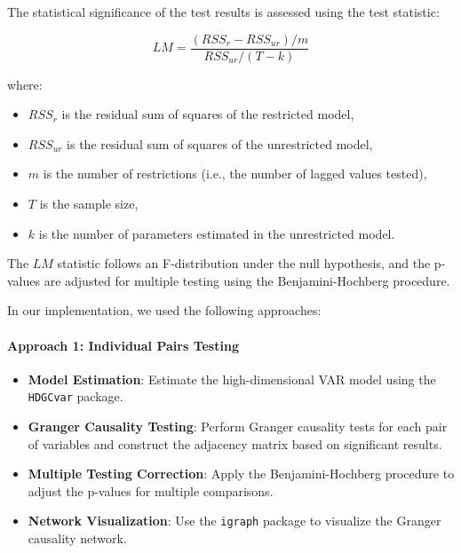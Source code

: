 \documentclass[12pt]{article}
\begin{document}
The statistical significance of the test results is assessed using the test statistic:

\[
LM = \frac{(RSS_r - RSS_{ur}) / m}{RSS_{ur} / (T - k)}
\]

where:
\begin{itemize}
    \item \(RSS_r\) is the residual sum of squares of the restricted model,
    \item \(RSS_{ur}\) is the residual sum of squares of the unrestricted model,
    \item \(m\) is the number of restrictions (i.e., the number of lagged values tested),
    \item \(T\) is the sample size,
    \item \(k\) is the number of parameters estimated in the unrestricted model.
\end{itemize}

The \(LM\) statistic follows an F-distribution under the null hypothesis, and the p-values are adjusted for multiple testing using the Benjamini-Hochberg procedure.

In our implementation, we used the following approaches:

\paragraph{Approach 1: Individual Pairs Testing}
\begin{itemize}

    \item \textbf{Model Estimation}: Estimate the high-dimensional VAR model using the \texttt{HDGCvar} package.
    \item \textbf{Granger Causality Testing}: Perform Granger causality tests for each pair of variables and construct the adjacency matrix based on significant results.
    \item \textbf{Multiple Testing Correction}: Apply the Benjamini-Hochberg procedure to adjust the p-values for multiple comparisons.
    \item \textbf{Network Visualization}: Use the \texttt{igraph} package to visualize the Granger causality network.
\end{itemize}
\end{document}
